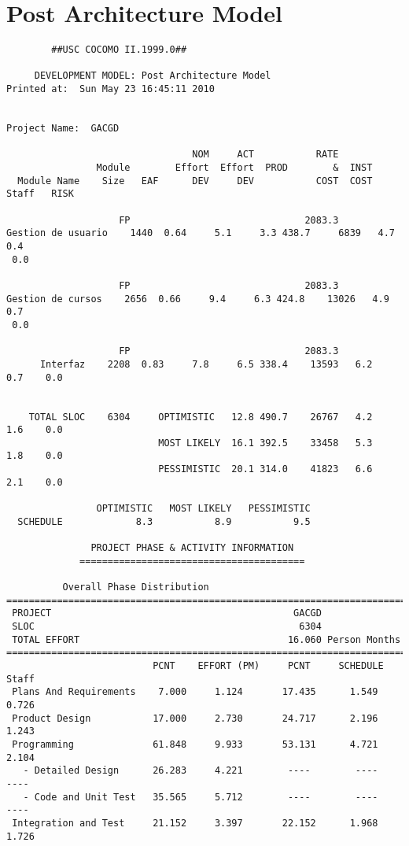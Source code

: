 \documentclass[11pt,a4paper,spanish,twoside]{report}
\begin{document}
\section{Post Architecture Model}
{\scriptsize
\begin{verbatim}
		##USC COCOMO II.1999.0##

	 DEVELOPMENT MODEL: Post Architecture Model
Printed at:  Sun May 23 16:45:11 2010


Project Name:  GACGD

                                 NOM     ACT           RATE             
                Module        Effort  Effort  PROD        &  INST
  Module Name    Size   EAF      DEV     DEV           COST  COST  Staff   RISK

                    FP                               2083.3             
Gestion de usuario    1440  0.64     5.1     3.3 438.7     6839   4.7    0.4   
 0.0

                    FP                               2083.3             
Gestion de cursos    2656  0.66     9.4     6.3 424.8    13026   4.9    0.7   
 0.0

                    FP                               2083.3             
      Interfaz    2208  0.83     7.8     6.5 338.4    13593   6.2    0.7    0.0


    TOTAL SLOC    6304     OPTIMISTIC   12.8 490.7    26767   4.2    1.6    0.0
                           MOST LIKELY  16.1 392.5    33458   5.3    1.8    0.0
                           PESSIMISTIC  20.1 314.0    41823   6.6    2.1    0.0

                OPTIMISTIC   MOST LIKELY   PESSIMISTIC
  SCHEDULE             8.3           8.9           9.5

		       PROJECT PHASE & ACTIVITY INFORMATION
		     ========================================

          Overall Phase Distribution
==============================================================================
 PROJECT                                           GACGD
 SLOC                                               6304
 TOTAL EFFORT                                     16.060 Person Months
==============================================================================
                          PCNT    EFFORT (PM)     PCNT     SCHEDULE       Staff
 Plans And Requirements    7.000     1.124       17.435      1.549       0.726
 Product Design           17.000     2.730       24.717      2.196       1.243
 Programming              61.848     9.933       53.131      4.721       2.104
   - Detailed Design      26.283     4.221        ----        ----        ----
   - Code and Unit Test   35.565     5.712        ----        ----        ----
 Integration and Test     21.152     3.397       22.152      1.968       1.726



\end{verbatim}}
\end{document}
